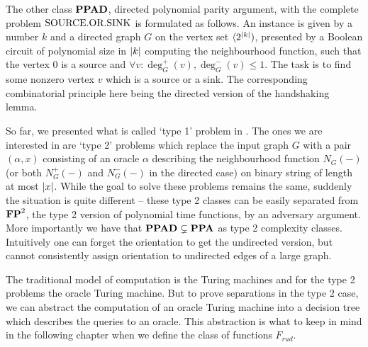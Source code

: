 The other class $\textbf{PPAD}$, directed polynomial parity argument, with the complete problem $\text{SOURCE.OR.SINK}$ is formulated as follows. An instance is given by a number $k$ and a directed graph $G$ on the vertex set $\langle 2^{\left|{k}\right|})$, presented by a Boolean circuit of polynomial size in $\left|{k}\right|$ computing the neighbourhood function, such that the vertex $0$ is a source and $\forall v: \deg_G^+(v),\deg_G^-(v)\leq 1$. The task is to find some nonzero vertex $v$ which is a source or a sink. The corresponding combinatorial principle here being the directed version of the handshaking lemma.

So far, we presented what is called `type 1' problem in \cite{beame1995rel}. The ones we are interested in are `type 2' problems which replace the input graph $G$ with a pair $(\alpha,x)$ consisting of an oracle $\alpha$ describing the neighbourhood function $N_G(-)$ (or both $N_G^+(-)$ and $N_G^-(-)$ in the directed case) on binary string of length at most $\left|{x}\right|$. While the goal to solve these problems remains the same, suddenly the situation is quite different -- these type 2 classes can be easily separated from $\textbf{FP}^2$, the type 2 version of polynomial time functions, by an adversary argument. More importantly we have that $\textbf{PPAD}\subsetneq \textbf{PPA}$ as type 2 complexity classes. Intuitively one can forget the orientation to get the undirected version, but cannot consistently assign orientation to undirected edges of a large graph.

The traditional model of computation is the Turing machines and for the type 2 problems the oracle Turing machine. But to prove separations in the type 2 case, we can abstract the computation of an oracle Turing machine into a decision tree which describes the queries to an oracle. This abstraction is what to keep in mind in the following chapter when we define the class of functions $F_{rud}$.
